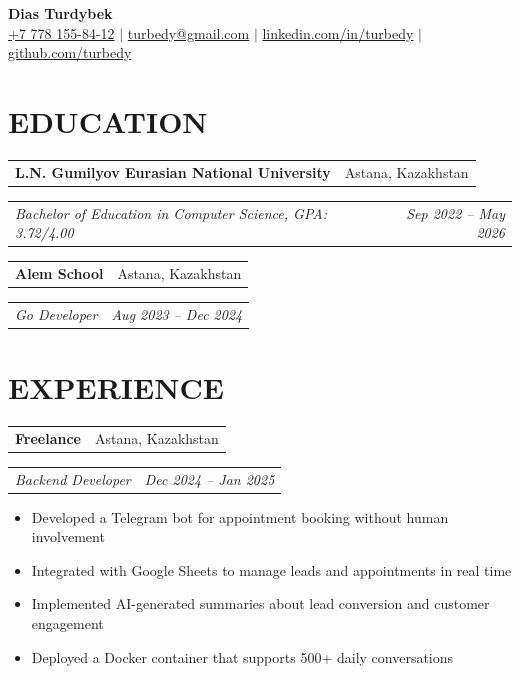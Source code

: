 \documentclass[letterpaper,11pt]{article}
\makeatletter
\newcommand{\row}[2]{
    \begin{tabular*}{\textwidth}[t]{@{}l@{\extracolsep{\fill}}r@{}}
        {#1} & {#2} \\
    \end{tabular*}%
}
\newcommand{\header}[2]{\row{\bfseries #1}{#2}}
\newcommand{\subheader}[2]{\row{\itshape #1}{\itshape #2}}
\makeatother
\begin{document}
    {\large\bfseries Dias Turdybek} \\
    \href{tel:+77781558412}{+7 778 155-84-12} $|$
    \href{mailto:turbedy@gmail.com}{turbedy@gmail.com} $|$
    \href{https://linkedin.com/in/turbedy}{linkedin.com/in/turbedy} $|$
    \href{https://github.com/turbedy}{github.com/turbedy} \\

    \section{EDUCATION}
    \header{L.N. Gumilyov Eurasian National University}{Astana, Kazakhstan}
    \subheader{Bachelor of Education in Computer Science, GPA: 3.72/4.00}{Sep 2022 -- May 2026}
    \header{Alem School}{Astana, Kazakhstan}
    \subheader{Go Developer}{Aug 2023 -- Dec 2024}

    \section{EXPERIENCE}
    \header{Freelance}{Astana, Kazakhstan}
    \subheader{Backend Developer}{Dec 2024 -- Jan 2025}
    \begin{itemize}
        \item Developed a Telegram bot for appointment booking without human involvement
        \item Integrated with Google Sheets to manage leads and appointments in real time
        \item Implemented AI-generated summaries about lead conversion and customer engagement
        \item Deployed a Docker container that supports 500+ daily conversations
    \end{itemize}
\end{document}

